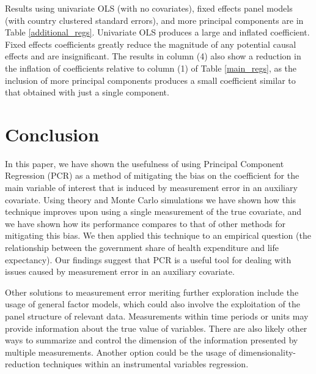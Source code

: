 \documentclass[10pt]{article}
\begin{document}
        Results using univariate OLS (with no covariates), fixed effects panel models (with country clustered standard errors), and more principal components are in Table \ref{additional_regs}. Univariate OLS produces a large and inflated coefficient. Fixed effects coefficients greatly reduce the magnitude of any potential causal effects and are insignificant. The results in column (4) also show a reduction in the inflation of coefficients relative to column (1) of Table \ref{main_regs}, as the inclusion of more principal components produces a small coefficient similar to that obtained with just a single component.

        

    \section*{Conclusion}
        
        In this paper, we have shown the usefulness of using Principal Component Regression (PCR) as a method of mitigating the bias on the coefficient for the main variable of interest that is induced by measurement error in an auxiliary covariate. Using theory and Monte Carlo simulations we have shown how this technique improves upon using a single measurement of the true covariate, and we have shown how its performance compares to that of other methods for mitigating this bias. We then applied this technique to an empirical question (the relationship between the government share of health expenditure and life expectancy). Our findings suggest that PCR is a useful tool for dealing with issues caused by measurement error in an auxiliary covariate.

        Other solutions to measurement error meriting further exploration include the usage of general factor models, which could also involve the exploitation of the panel structure of relevant data. Measurements within time periods or units may provide information about the true value of variables. There are also likely other ways to summarize and control the dimension of the information presented by multiple measurements. Another option could be the usage of dimensionality-reduction techniques within an instrumental variables regression.

    \clearpage \newpage

    
    

    \clearpage \newpage
\end{document}
